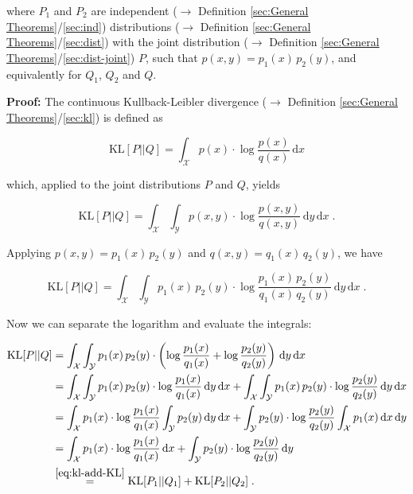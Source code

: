 \documentclass[a4paper,12pt,twoside]{book}
\begin{document}
where $P_1$ and $P_2$ are independent ($\rightarrow$ Definition \ref{sec:General Theorems}/\ref{sec:ind}) distributions ($\rightarrow$ Definition \ref{sec:General Theorems}/\ref{sec:dist}) with the joint distribution ($\rightarrow$ Definition \ref{sec:General Theorems}/\ref{sec:dist-joint}) $P$, such that $p(x,y) = p_1(x) \, p_2(y)$, and equivalently for $Q_1$, $Q_2$ and $Q$.


\vspace{1em}
\textbf{Proof:} The continuous Kullback-Leibler divergence ($\rightarrow$ Definition \ref{sec:General Theorems}/\ref{sec:kl}) is defined as

\begin{equation} \label{eq:kl-add-KL}
\mathrm{KL}[P||Q] = \int_{\mathcal{X}} p(x) \cdot \log \frac{p(x)}{q(x)} \, \mathrm{d}x
\end{equation}

which, applied to the joint distributions $P$ and $Q$, yields

\begin{equation} \label{eq:kl-add-KL-s1}
\mathrm{KL}[P||Q] = \int_{\mathcal{X}} \int_{\mathcal{Y}} p(x,y) \cdot \log \frac{p(x,y)}{q(x,y)} \, \mathrm{d}y \, \mathrm{d}x \; .
\end{equation}

Applying $p(x,y) = p_1(x) \, p_2(y)$ and $q(x,y) = q_1(x) \, q_2(y)$, we have

\begin{equation} \label{eq:kl-add-KL-s2}
\mathrm{KL}[P||Q] = \int_{\mathcal{X}} \int_{\mathcal{Y}} p_1(x) \, p_2(y) \cdot \log \frac{p_1(x) \, p_2(y)}{q_1(x) \, q_2(y)} \, \mathrm{d}y \, \mathrm{d}x \; .
\end{equation}

Now we can separate the logarithm and evaluate the integrals:

\begin{equation} \label{eq:kl-add-KL-qed}
\begin{split}
\mathrm{KL}[P||Q] &= \int_{\mathcal{X}} \int_{\mathcal{Y}} p_1(x) \, p_2(y) \cdot \left( \log \frac{p_1(x)}{q_1(x)} + \log \frac{p_2(y)}{q_2(y)} \right) \, \mathrm{d}y \, \mathrm{d}x \\
&= \int_{\mathcal{X}} \int_{\mathcal{Y}} p_1(x) \, p_2(y) \cdot \log \frac{p_1(x)}{q_1(x)} \, \mathrm{d}y \, \mathrm{d}x + \int_{\mathcal{X}} \int_{\mathcal{Y}} p_1(x) \, p_2(y) \cdot \log \frac{p_2(y)}{q_2(y)} \, \mathrm{d}y \, \mathrm{d}x \\
&= \int_{\mathcal{X}} p_1(x) \cdot \log \frac{p_1(x)}{q_1(x)} \int_{\mathcal{Y}} p_2(y) \, \mathrm{d}y \, \mathrm{d}x + \int_{\mathcal{Y}} p_2(y) \cdot \log \frac{p_2(y)}{q_2(y)} \int_{\mathcal{X}} p_1(x) \, \mathrm{d}x \, \mathrm{d}y \\
&= \int_{\mathcal{X}} p_1(x) \cdot \log \frac{p_1(x)}{q_1(x)} \, \mathrm{d}x + \int_{\mathcal{Y}} p_2(y) \cdot \log \frac{p_2(y)}{q_2(y)} \, \mathrm{d}y \\
&\overset{\eqref{eq:kl-add-KL}}{=} \mathrm{KL}[P_1||Q_1] + \mathrm{KL}[P_2||Q_2] \; .
\end{split}
\end{equation}
\end{document}
